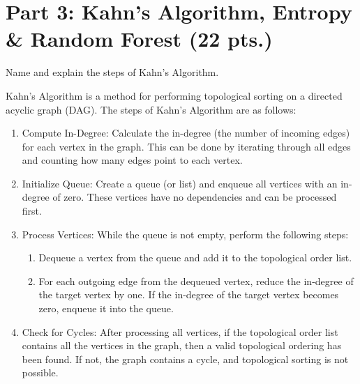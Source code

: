 \documentclass[12pt]{article}
\begin{document}
    \newpage

    \section*{Part 3: Kahn's Algorithm, Entropy \& Random Forest (22 pts.)}

    \begin{ejercicio}
        Name and explain the steps of Kahn's Algorithm.

        Kahn's Algorithm is a method for performing topological sorting on a directed acyclic graph (DAG). The steps of Kahn's Algorithm are as follows:
        \begin{enumerate}
            \item Compute In-Degree: Calculate the in-degree (the number of incoming edges) for each vertex in the graph. This can be done by iterating through all edges and counting how many edges point to each vertex.
            \item Initialize Queue: Create a queue (or list) and enqueue all vertices with an in-degree of zero. These vertices have no dependencies and can be processed first.
            \item Process Vertices: While the queue is not empty, perform the following steps:
            \begin{enumerate}
                \item Dequeue a vertex from the queue and add it to the topological order list.
                \item For each outgoing edge from the dequeued vertex, reduce the in-degree of the target vertex by one. If the in-degree of the target vertex becomes zero, enqueue it into the queue.
            \end{enumerate}
            \item Check for Cycles: After processing all vertices, if the topological order list contains all the vertices in the graph, then a valid topological ordering has been found. If not, the graph contains a cycle, and topological sorting is not possible.
        \end{enumerate}
    \end{ejercicio}
\end{document}
